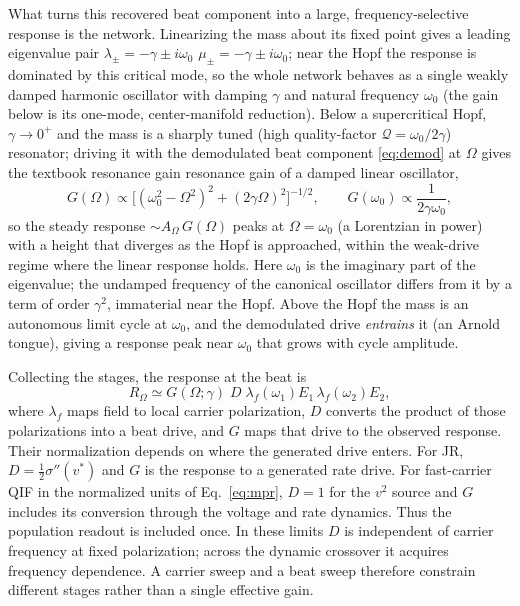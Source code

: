 \documentclass[11pt,a4paper]{article}
\newcommand{\Sig}{\sigma}
\newcommand{\half}{\tfrac{1}{2}}
\providecommand{\DIFaddtex}[1]{{\protect\color{blue} \sf #1}} %
\providecommand{\DIFdeltex}[1]{{\protect\color{red} \scriptsize #1}} %
\providecommand{\DIFaddbegin}{} %
\providecommand{\DIFaddend}{} %
\providecommand{\DIFdelbegin}{} %
\providecommand{\DIFdelend}{} %
\providecommand{\DIFadd}[1]{\texorpdfstring{\DIFaddtex{#1}}{#1}} %
\providecommand{\DIFdel}[1]{\texorpdfstring{\DIFdeltex{#1}}{}} %
\begin{document}
What turns this recovered beat component into a large, frequency-selective response is
the network. Linearizing the mass about its fixed point gives a leading eigenvalue pair
\DIFdelbegin \DIFdel{$\lambda_\pm=-\gamma\pm i\omega_0$}\DIFdelend \DIFaddbegin \DIFadd{$\mu_\pm=-\gamma\pm i\omega_0$}\DIFaddend ; near the Hopf the response is dominated by this critical
mode, so the whole network behaves as a single weakly damped harmonic oscillator with
damping $\gamma$ and natural frequency $\omega_0$ (the gain below is its one-mode,
center-manifold reduction). Below a supercritical Hopf, $\gamma\to0^+$ and
the mass is a sharply tuned (high quality-factor $\mathcal{Q}=\omega_0/2\gamma$) resonator;
driving it with the demodulated beat component
\eqref{eq:demod} at $\Omega$ gives the \DIFdelbegin \DIFdel{textbook resonance gain }\DIFdelend \DIFaddbegin \DIFadd{resonance gain of a damped linear oscillator,
}\DIFaddend \begin{equation}
G(\Omega)\propto\big[(\omega_0^2-\Omega^2)^2+(2\gamma\Omega)^2\big]^{-1/2},
\qquad G(\omega_0)\propto\frac{1}{2\gamma\omega_0},
\label{eq:gain}
\end{equation}
so the steady response $\sim A_\Omega\,G(\Omega)$ peaks at $\Omega=\omega_0$ (a
Lorentzian in power) with a height that diverges as the Hopf is approached, within the
weak-drive regime where the linear response holds. Here $\omega_0$ is the imaginary part of
the eigenvalue; the undamped frequency of the canonical oscillator differs from it by a
term of order $\gamma^2$, immaterial near the Hopf. Above the
Hopf the mass is an autonomous limit cycle at $\omega_0$, and the demodulated drive
\emph{entrains} it (an Arnold tongue), giving a response peak near $\omega_0$ that
grows with cycle amplitude.

Collecting the stages, the response at the beat is
\begin{equation}
R_\Omega\simeq G(\Omega;\gamma)\;D\;\lambda_f(\omega_1)E_1\,\lambda_f(\omega_2)E_2 ,
\label{eq:receiver}
\end{equation}
where $\lambda_f$ maps field to local carrier polarization, $D$ converts the
product of those polarizations into a beat drive, and $G$ maps that drive to the
observed response. Their normalization depends on where the generated drive enters.
For JR, $D=\half\Sig''(v^*)$ and $G$ is the response to a generated rate drive.
For fast-carrier QIF in the normalized units of Eq.~\eqref{eq:mpr}, $D=1$ for
the $v^2$ source and $G$ includes its conversion through the voltage and rate
dynamics. Thus the population readout is included once. In these limits $D$ is
independent of carrier frequency at fixed polarization; across the dynamic
crossover it acquires frequency dependence. A carrier sweep and a beat sweep
therefore constrain different stages rather than a single effective gain.
\end{document}
